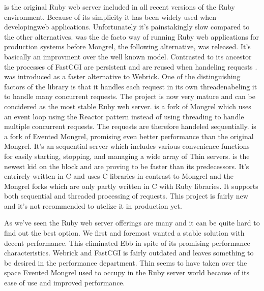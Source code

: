 \begin{items}
   is the original Ruby web server included in all recent
    versions of the Ruby environment. Because of its simplicity it has
    been widely used when developingweb applications. Unfortunately it's
    painstakingly slow compared to the other alternatives.
   was the de facto way of running Ruby web applications
    for production systems before Mongrel, the following alternative,
    was released. It's basically an improvment over the well known
     model. Contrasted to its ancestor the processes
    of FastCGI are persistent and are reused when handeling requests
    \citep{openmarket96}.
   was introduced as a faster alternative to Webrick.
    One of the distinguishing factors of the library is that it
    handles each request in its own thread\dash{}enabeling it to
    handle many concurrent requests. The project is now very mature
    and can be concidered as the most stable Ruby web server.
   is a fork of Mongrel which uses
    an event loop using the Reactor pattern
    \citep[]{schmidt95}
    instead of using threading to handle multiple concurrent requests.
    The requests are therefore handeled sequentially.
   is a fork of Evented Mongrel, promising even better
    performance than the original Mongrel. It's an sequential
    server which includes various
    convenience functions for easily starting, stopping, and managing
    a wide array of Thin servers.
   is the newest kid on the block and are proving to be
    faster than its predecessors. It's entrirely written in C
    and uses C libraries in contrast to Mongrel and the Mongrel forks
    which are only partly written in C with Ruby libraries.
    It supports both sequential and threaded processing of requests.
    This project is fairly new and it's not recommended to utelize it
    in production yet.
\end{items}

As we've seen the Ruby web server offerings are many and it can be quite hard
to find out the best option. We first and foremost wanted a stable solution
with decent performance. This eliminated Ebb in spite of its promising
performance characteristics. Webrick and FastCGI is fairly outdated and leaves
something to be desired in the performance department. Thin seems to have
taken over the space Evented Mongrel used to occupy in the Ruby server world
because of its ease of use and improved performance.

